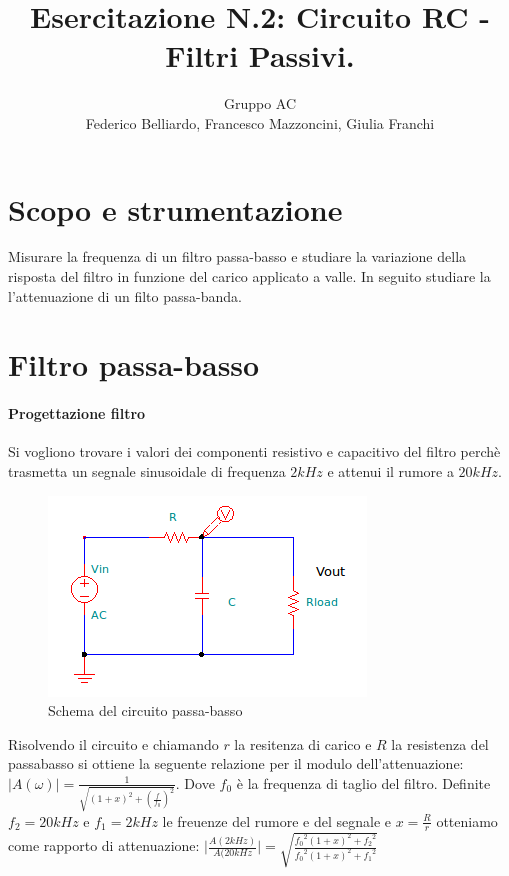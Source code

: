 \documentclass[10pt,a4paper]{article}
\author{Gruppo AC \\ Federico Belliardo, Francesco Mazzoncini, Giulia Franchi}
\title{Esercitazione N.2: Circuito RC - Filtri Passivi.}
\begin{document}
\maketitle

\section{Scopo e strumentazione}

Misurare la frequenza di un filtro passa-basso e studiare la variazione della risposta del filtro in funzione del carico applicato a valle. In seguito studiare la l'attenuazione di un filto passa-banda.

\section{Filtro passa-basso}
\paragraph{Progettazione filtro}
Si vogliono trovare i valori dei componenti resistivo e capacitivo del filtro perchè trasmetta un segnale sinusoidale di frequenza $2kHz$ e attenui il rumore a $20kHz$.

\begin{figure}[h]
\centering
\includegraphics[scale=1.0]{passabasso.png}
\caption{Schema del circuito passa-basso}
\end{figure}

Risolvendo il circuito e chiamando $r$ la resitenza di carico e $R$ la resistenza del passabasso si ottiene la seguente relazione per il modulo dell'attenuazione:
$\vert A(\omega) \vert = \frac{1}{\sqrt{(1+x)^2+(\frac{f}{f_{0}})^2}} $. Dove $f_0$ è la frequenza di taglio del filtro. Definite $f_2 = 20 kHz$ e $f_1 = 2 kHz$ le freuenze del rumore e del segnale e $x = \frac {R}{r}$ otteniamo come rapporto di attenuazione: 
$\vert \frac{A(2 kHz)}{A(20 kHz} \vert = \sqrt{\frac{{f_0}^2 (1+x)^2 + {f_2}^2}{{f_0}^2 (1+x)^2 + {f_1}^2}}$
\end{document}
